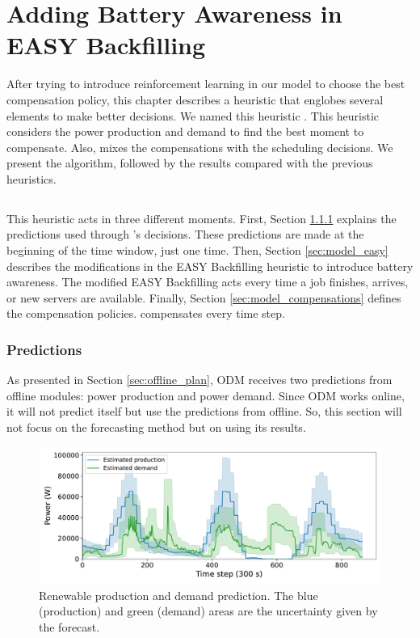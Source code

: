 \chapter{Adding Battery Awareness in EASY Backfilling}
\label{cha:heuristic}

\minitoc

After trying to introduce reinforcement learning in our model to choose the best compensation policy, this chapter describes a heuristic that englobes several elements to make better decisions. We named this heuristic \emph{\systemName}. This heuristic considers the power production and demand to find the best moment to compensate. Also, \emph{\systemName} mixes the compensations with the scheduling decisions. We present the algorithm, followed by the results compared with the previous heuristics.

\section{\systemName}

This heuristic acts in three different moments. First, Section \ref{sec:model_predictions} explains the predictions used through \emph{\systemName}'s decisions. These predictions are made at the beginning of the time window, just one time. Then, Section \ref{sec:model_easy} describes the modifications in the EASY Backfilling heuristic to introduce battery awareness. The modified EASY Backfilling acts every time a job finishes, arrives, or new servers are available. Finally, Section \ref{sec:model_compensations} defines the compensation policies. \emph{\systemName} compensates every time step.

\subsection{Predictions}
\label{sec:model_predictions}

As presented in Section \ref{sec:offline_plan}, ODM receives two predictions from offline modules: power production and power demand. Since ODM works online, it will not predict itself but use the predictions from offline. So, this section will not focus on the forecasting method but on using its results.

\begin{figure}[!htb]
    \centering
    \includegraphics[scale=0.5]{Images/Heuristic/predictions.pdf}
    \caption{Renewable production and demand prediction. The blue (production) and green (demand) areas are the uncertainty given by the forecast.}
    \label{fig:predictions}
\end{figure}


